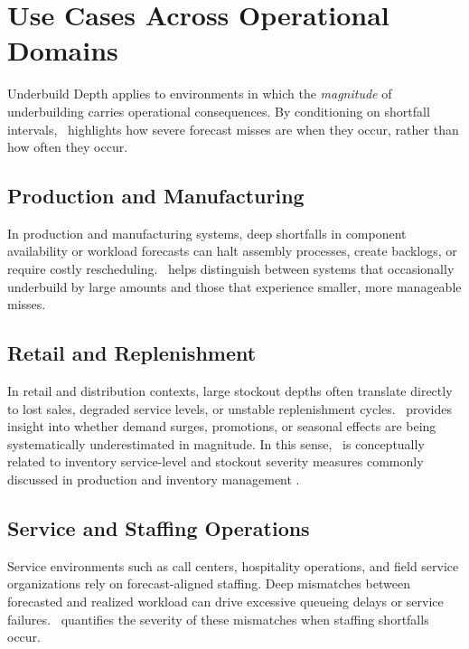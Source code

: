 \section{Use Cases Across Operational Domains}

Underbuild Depth applies to environments in which the \emph{magnitude} of
underbuilding carries operational consequences. By conditioning on shortfall
intervals, \UD\ highlights how severe forecast misses are when they occur, rather
than how often they occur.

\subsection{Production and Manufacturing}

In production and manufacturing systems, deep shortfalls in component availability
or workload forecasts can halt assembly processes, create backlogs, or require
costly rescheduling. \UD\ helps distinguish between systems that occasionally
underbuild by large amounts and those that experience smaller, more manageable
misses.

\subsection{Retail and Replenishment}

In retail and distribution contexts, large stockout depths often translate directly
to lost sales, degraded service levels, or unstable replenishment cycles. \UD\
provides insight into whether demand surges, promotions, or seasonal effects are
being systematically underestimated in magnitude. In this sense, \UD\ is
conceptually related to inventory service-level and stockout severity measures
commonly discussed in production and inventory management
\citep{silver1998inventory}.

\subsection{Service and Staffing Operations}

Service environments such as call centers, hospitality operations, and field
service organizations rely on forecast-aligned staffing. Deep mismatches between
forecasted and realized workload can drive excessive queueing delays or service
failures. \UD\ quantifies the severity of these mismatches when staffing shortfalls
occur.

